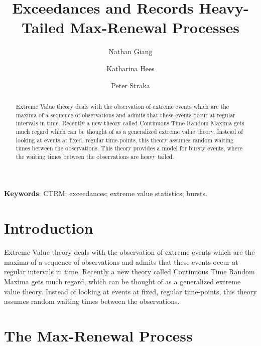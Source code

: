 \documentclass[12pt]{article}
\title{Exceedances and Records Heavy-Tailed Max-Renewal Processes}
\author{Nathan Giang \and Katharina Hees \and Peter Straka}
\newcommand{\1}{\mathbf 1}
\begin{document}
\maketitle

\begin{abstract}
Extreme Value theory deals with the observation of extreme events which are the maxima of a sequence of observations and admits that these events occur at regular intervals in time. Recently a new theory called Continuous Time Random Maxima gets much regard which can be thought of as a generalized extreme value theory. Instead of looking at events at fixed, regular time-points, this theory assumes random waiting times between the observations. This theory provides a model for bursty events, where the waiting times between the observations are heavy tailed.\\

\end{abstract}

{\bf Keywords}: CTRM; exceedances; extreme value statistics; bursts.


\setlength{\parindent}{0pt}

\section{Introduction}
Extreme Value theory deals with the observation of extreme events which are the maxima of a sequence of observations and admits that these events occur at regular intervals in time. Recently a new theory called Continuous Time Random Maxima gets much regard, which can be thought of as a generalized extreme value theory. Instead of looking at events at fixed, regular time-points, this theory assumes random waiting times between the observations.


\section{The Max-Renewal Process}
\end{document}

